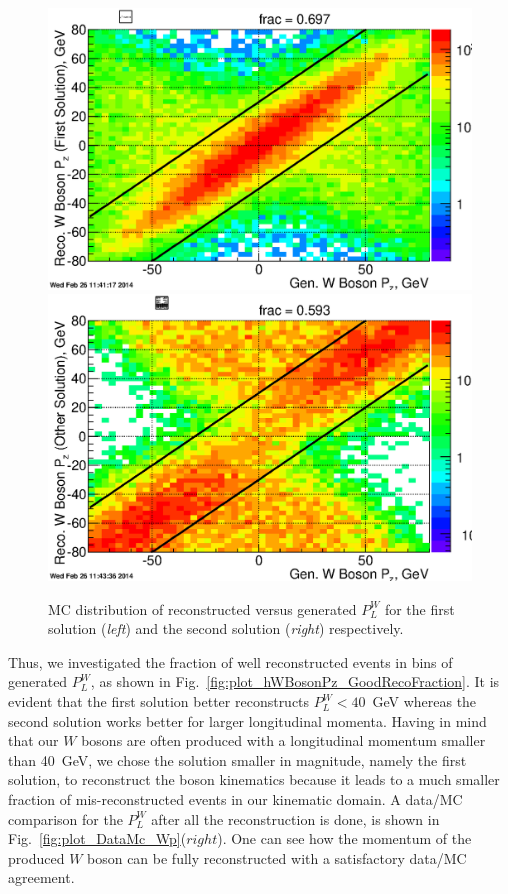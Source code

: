 \documentclass[12pt]{article}
\begin{document}
\begin{figure}[htbp]
\begin{center}
\includegraphics[scale=0.43]{images/P_long_study/hRecoVsWBosonPz_FirstSol}
\includegraphics[scale=0.43]{images/P_long_study/hRecoVsWBosonPz_OtherSol}
\end{center}
\caption{MC distribution of reconstructed versus generated $P^{W}_{L}$ for the first solution ({\it left}) and the second solution ({\it right}) respectively.}
\label{fig:plot_hRecoVsWBosonPz} 
\end{figure} 
Thus, we investigated the fraction of well reconstructed events in bins of  generated $P^{W}_{L}$, as shown in Fig.~\ref{fig:plot_hWBosonPz_GoodRecoFraction}.
It is evident that the first solution better reconstructs  $P^{W}_{L}<40$~GeV whereas the second solution works better for larger longitudinal momenta.  
Having in mind that our $W$ bosons are often produced with a longitudinal momentum smaller than 40~GeV, we chose the solution smaller in magnitude, namely the first solution, to reconstruct the boson kinematics because it leads to a much smaller fraction of mis-reconstructed events in our kinematic domain. A data/MC comparison for the $P^{W}_{L}$ after all the reconstruction is done, is shown in Fig.~\ref{fig:plot_DataMc_Wp}($right$). One can see how the momentum of the produced $W$ boson can be fully reconstructed with a satisfactory data/MC agreement. 
 
\end{document}
